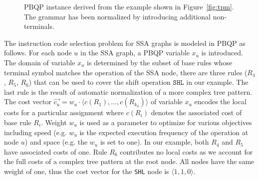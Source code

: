 \begin{figure}
\begin{center}
\begin{tikzpicture}
    \end{tikzpicture}
  \end{center}
  \caption{PBQP instance derived from the example shown in
    Figure~\ref{fig:tpm}. The grammar has been normalized by
    introducing additional non-terminals.}\label{fig:pbpq-example}
\end{figure}


The instruction code selection problem for SSA graphs is modeled in PBQP as
follows. For each node $u$ in the SSA graph, a PBQP variable $x_u$ is
introduced. The domain of variable $x_u$ is determined by the subset
of base rules whose terminal symbol matches the operation of the SSA
node, \eg there are three rules ($R_4$, $R_5$, $R_6$) that can be
used to cover the shift operation $\texttt{SHL}$ in our example. The
last rule is the result of automatic normalization of a more complex
tree pattern.
The cost vector $\vec{c_u}= w_u \cdot \langle c(R_1), \dots,
c(R_{k_u}) \rangle$ of variable $x_u$ encodes the local costs for a
particular assignment where $c(R_i)$ denotes the associated cost of
base rule $R_i$. Weight $w_u$ is used as a parameter to optimize for
various objectives including speed (e.g. $w_u$ is the expected
execution frequency of the operation at node $u$) and space (e.g. the
$w_u$ is set to one). In our example, both $R_4$ and $R_5$ have
associated costs of one. Rule $R_6$ contributes no local costs as we
account for the full costs of a complex tree pattern at the root
node. All nodes have the same weight of one, thus the cost vector for
the \texttt{SHL} node is $\langle1, 1, 0 \rangle$.

